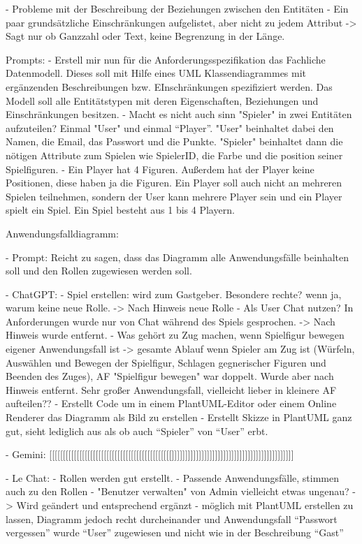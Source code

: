     - Probleme mit der Beschreibung der Beziehungen zwischen den Entitäten
    - Ein paar grundsätzliche Einschränkungen aufgelistet, aber nicht zu jedem Attribut -> Sagt nur ob Ganzzahl oder Text,
    keine Begrenzung in der Länge.

    Prompts:
        - Erstell mir nun für die Anforderungsspezifikation das Fachliche Datenmodell. Dieses soll mit Hilfe eines UML Klassendiagrammes mit ergänzenden Beschreibungen bzw. EInschränkungen spezifiziert werden. Das Modell soll alle Entitätstypen mit deren Eigenschaften, Beziehungen und Einschränkungen besitzen.
        - Macht es nicht auch sinn "Spieler" in zwei Entitäten aufzuteilen? Einmal "User" und einmal ``Player''.  "User" beinhaltet dabei den Namen, die Email, das Passwort und die Punkte. "Spieler" beinhaltet dann die nötigen Attribute zum Spielen wie SpielerID, die Farbe und die position seiner Spielfiguren.
        - Ein Player hat 4 Figuren. Außerdem hat der Player keine Positionen, diese haben ja die Figuren. Ein Player soll auch nicht an mehreren Spielen teilnehmen, sondern der User kann mehrere Player sein und ein Player spielt ein Spiel. Ein Spiel besteht aus 1 bis 4 Playern.


Anwendungsfalldiagramm:

- Prompt: Reicht zu sagen, dass das Diagramm alle Anwendungsfälle beinhalten soll und den Rollen zugewiesen werden soll.

- ChatGPT:
    - Spiel erstellen: wird zum Gastgeber. Besondere rechte? wenn ja, warum keine neue Rolle. -> Nach Hinweis neue Rolle
    - Als User Chat nutzen? In Anforderungen wurde nur von Chat während des Spiels gesprochen. -> Nach Hinweis wurde entfernt.
    - Was gehört zu Zug machen, wenn Spielfigur bewegen eigener Anwendungsfall ist -> gesamte Ablauf wenn Spieler am Zug ist
    (Würfeln, Auswählen und Bewegen der Spielfigur, Schlagen gegnerischer Figuren und Beenden des Zuges), AF "Spielfigur bewegen" 
    war doppelt. Wurde aber nach Hinweis entfernt. Sehr großer Anwendungsfall, vielleicht lieber in kleinere AF aufteilen??
    - Erstellt Code um in einem PlantUML-Editor oder einem Online Renderer das Diagramm als Bild zu erstellen
    - Erstellt Skizze in PlantUML ganz gut, sieht lediglich aus als ob auch ``Spieler'' von ``User'' erbt.

- Gemini: [[[[[[[[[[[[[[[[[[[[[[[[[[[[[[[[[[[[[[[[[[[[[]]]]]]]]]]]]]]]]]]]]]]]]]]]]]]]]]]]]]]]]]]]]]

- Le Chat:
    - Rollen werden gut erstellt.
    - Passende Anwendungsfälle, stimmen auch zu den Rollen
    - "Benutzer verwalten" von Admin vielleicht etwas ungenau? -> Wird geändert und entsprechend ergänzt
    - möglich mit PlantUML erstellen zu lassen, Diagramm jedoch recht durcheinander und Anwendungsfall ``Passwort vergessen'' wurde ``User'' 
    zugewiesen und nicht wie in der Beschreibung ``Gast''


